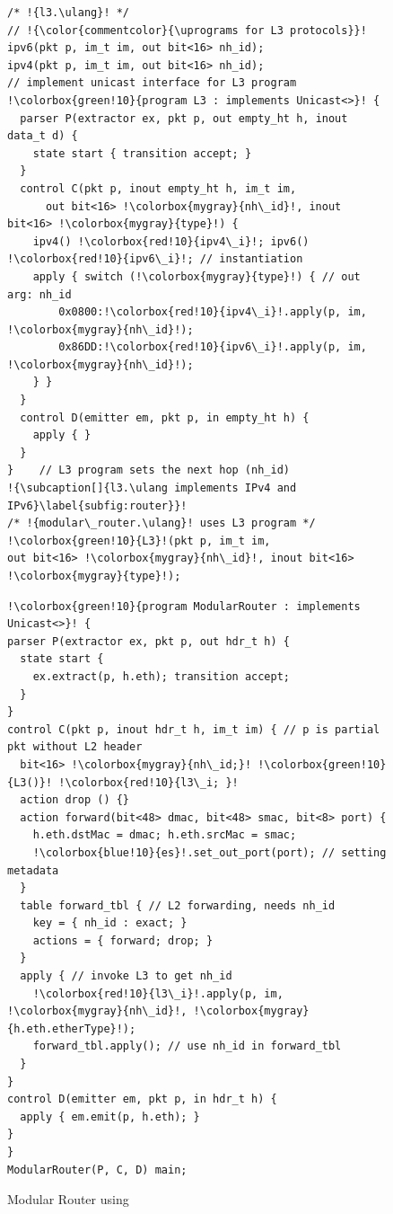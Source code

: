 \documentclass[letterpaper,twocolumn,10pt]{article}
\begin{document}
\begin{figure}[!ht]
\noindent \begin{minipage}[t]{.50\textwidth}
\begin{lstlisting}[frame=none, escapechar=!]
/* !{l3.\ulang}! */
// !{\color{commentcolor}{\uprograms for L3 protocols}}! 
ipv6(pkt p, im_t im, out bit<16> nh_id);
ipv4(pkt p, im_t im, out bit<16> nh_id);
// implement unicast interface for L3 program
!\colorbox{green!10}{program L3 : implements Unicast<>}! {
  parser P(extractor ex, pkt p, out empty_ht h, inout data_t d) {
    state start { transition accept; }
  }
  control C(pkt p, inout empty_ht h, im_t im,
      out bit<16> !\colorbox{mygray}{nh\_id}!, inout bit<16> !\colorbox{mygray}{type}!) {
    ipv4() !\colorbox{red!10}{ipv4\_i}!; ipv6() !\colorbox{red!10}{ipv6\_i}!; // instantiation
    apply { switch (!\colorbox{mygray}{type}!) { // out arg: nh_id
        0x0800:!\colorbox{red!10}{ipv4\_i}!.apply(p, im, !\colorbox{mygray}{nh\_id}!);
        0x86DD:!\colorbox{red!10}{ipv6\_i}!.apply(p, im, !\colorbox{mygray}{nh\_id}!);
    } }
  }
  control D(emitter em, pkt p, in empty_ht h) {
    apply { }
  }
}    // L3 program sets the next hop (nh_id)
!{\subcaption[]{l3.\ulang implements IPv4 and IPv6}\label{subfig:router}}!
/* !{modular\_router.\ulang}! uses L3 program */
!\colorbox{green!10}{L3}!(pkt p, im_t im, 
out bit<16> !\colorbox{mygray}{nh\_id}!, inout bit<16> !\colorbox{mygray}{type}!);
\end{lstlisting}
\end{minipage}\hspace{-4pt}\vline
\hfill\begin{minipage}[t]{.50\textwidth}
\begin{lstlisting}[frame=none, escapechar=!]
!\colorbox{green!10}{program ModularRouter : implements Unicast<>}! {
parser P(extractor ex, pkt p, out hdr_t h) {
  state start {
    ex.extract(p, h.eth); transition accept;
  }
}
control C(pkt p, inout hdr_t h, im_t im) { // p is partial pkt without L2 header
  bit<16> !\colorbox{mygray}{nh\_id;}! !\colorbox{green!10}{L3()}! !\colorbox{red!10}{l3\_i; }!
  action drop () {}
  action forward(bit<48> dmac, bit<48> smac, bit<8> port) {
    h.eth.dstMac = dmac; h.eth.srcMac = smac;
    !\colorbox{blue!10}{es}!.set_out_port(port); // setting metadata
  }
  table forward_tbl { // L2 forwarding, needs nh_id
    key = { nh_id : exact; } 
    actions = { forward; drop; }
  }
  apply { // invoke L3 to get nh_id
    !\colorbox{red!10}{l3\_i}!.apply(p, im, !\colorbox{mygray}{nh\_id}!, !\colorbox{mygray}{h.eth.etherType}!);
    forward_tbl.apply(); // use nh_id in forward_tbl
  }
}
control D(emitter em, pkt p, in hdr_t h) {
  apply { em.emit(p, h.eth); }
}
}
ModularRouter(P, C, D) main;
\end{lstlisting}
\label{subfig:router-main}
\end{minipage}
\caption[]{Modular Router using \uarch \footnotemark}
\label{fig:modular-router}
\end{figure}
\end{document}
